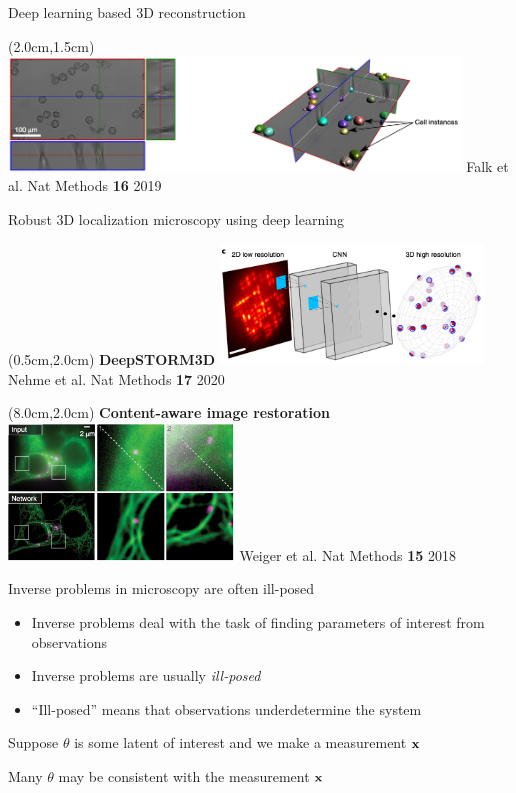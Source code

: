 \documentclass{beamer}					%
\begin{document}
\begin{frame}{Deep learning based 3D reconstruction}
\begin{textblock*}{12cm}(2.0cm,1.5cm)
\includegraphics[width=12cm]{../../postdoc/sartorius/media/UNET-1.png}
Falk et al. Nat Methods \textbf{16} 2019
\end{textblock*}
\end{frame}


\begin{frame}{Robust 3D localization microscopy using deep learning}
\begin{textblock*}{7cm}(0.5cm,2.0cm)
\textbf{DeepSTORM3D}
\includegraphics[width=7cm]{../../postdoc/sartorius/media/DS3D.png}
Nehme et al. Nat Methods \textbf{17} 2020
\end{textblock*}
\begin{textblock*}{6cm}(8.0cm,2.0cm)
\textbf{Content-aware image restoration}
\includegraphics[width=6cm]{../../postdoc/sartorius/media/CARE.png}
Weiger et al. Nat Methods \textbf{15} 2018
\end{textblock*}
\end{frame}

\begin{frame}{Inverse problems in microscopy are often ill-posed}

\begin{itemize}
\item Inverse problems deal with the task of finding parameters of interest from observations
\item Inverse problems are usually \emph{ill-posed}
\item ``Ill-posed'' means that observations underdetermine the system
\end{itemize}

\vspace{0.2in}
Suppose $\theta$ is some latent of interest and we make a measurement $\bold{x}$

\vspace{0.2in}
Many $\theta$ may be consistent with the measurement $\bold{x}$

\end{frame}
\end{document}
